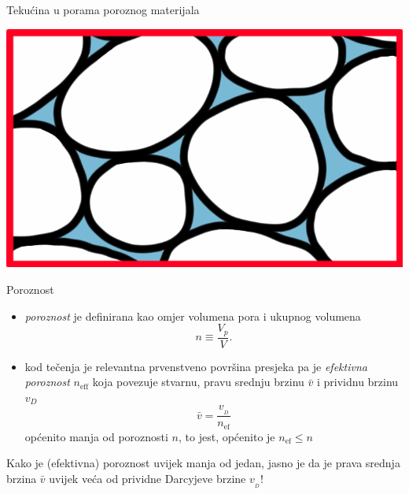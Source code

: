 \documentclass[croatian]{beamer}
\begin{document}
%
\begin{frame}{Tekućina u porama poroznog materijala}
\begin{center}
\includegraphics[height=0.55\paperheight]{slike/MF-11-tekucina-u-porama} 
\par\end{center}

\end{frame}
%
\begin{frame}{Poroznost}
\begin{itemize}
\item \emph{poroznost} je definirana kao omjer volumena pora i ukupnog volumena
\[
n\equiv\frac{V_{p}}{V}.
\]
\item kod tečenja je relevantna prvenstveno površina presjeka pa je \emph{efektivna
poroznost} $n_{\text{eff}}$ koja povezuje stvarnu, pravu srednju
brzinu $\bar{v}$ i prividnu brzinu $v_{{\scriptscriptstyle D}}$
\[
\bar{v}=\frac{v_{{\scriptscriptstyle _{D}}}}{n_{\text{ef}}}
\]
općenito manja od poroznosti $n$, to jest, općenito je $n_{\text{ef}}\leq n$ 
\end{itemize}
\begin{alertblock}{}
Kako je (efektivna) poroznost uvijek manja od jedan, jasno je da
je prava srednja brzina $\bar{v}$ uvijek veća od prividne Darcyjeve
brzine $v_{{\scriptscriptstyle _{D}}}$! 
\end{alertblock}
\end{frame}
\end{document}
